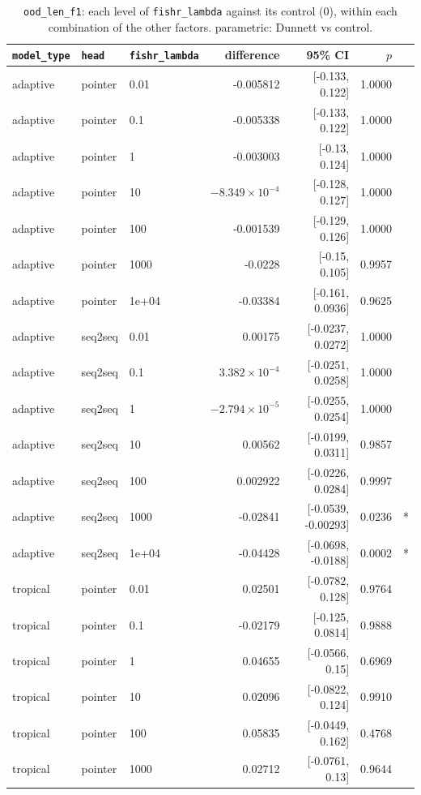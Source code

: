 \documentclass[10pt]{article}
\begin{document}
{\small
\begin{longtable}{lllrrrl}
\caption{\texttt{ood\_len\_f1}: each level of \texttt{fishr\_lambda} against its control (0), within each combination of the other factors. parametric: Dunnett vs control.}\label{tab:control-ood_len_f1}\\
\toprule
\texttt{model\_type} & \texttt{head} & \texttt{fishr\_lambda} & difference & 95\% CI & $p$ & \\
\midrule
\endhead
adaptive & pointer & 0.01 & -0.005812 & [-0.133, 0.122] & 1.0000 & \\
adaptive & pointer & 0.1 & -0.005338 & [-0.133, 0.122] & 1.0000 & \\
adaptive & pointer & 1 & -0.003003 & [-0.13, 0.124] & 1.0000 & \\
adaptive & pointer & 10 & $-8.349\times10^{-4}$ & [-0.128, 0.127] & 1.0000 & \\
adaptive & pointer & 100 & -0.001539 & [-0.129, 0.126] & 1.0000 & \\
adaptive & pointer & 1000 & -0.0228 & [-0.15, 0.105] & 0.9957 & \\
adaptive & pointer & 1e+04 & -0.03384 & [-0.161, 0.0936] & 0.9625 & \\
adaptive & seq2seq & 0.01 & 0.00175 & [-0.0237, 0.0272] & 1.0000 & \\
adaptive & seq2seq & 0.1 & $3.382\times10^{-4}$ & [-0.0251, 0.0258] & 1.0000 & \\
adaptive & seq2seq & 1 & $-2.794\times10^{-5}$ & [-0.0255, 0.0254] & 1.0000 & \\
adaptive & seq2seq & 10 & 0.00562 & [-0.0199, 0.0311] & 0.9857 & \\
adaptive & seq2seq & 100 & 0.002922 & [-0.0226, 0.0284] & 0.9997 & \\
adaptive & seq2seq & 1000 & -0.02841 & [-0.0539, -0.00293] & 0.0236 & *\\
adaptive & seq2seq & 1e+04 & -0.04428 & [-0.0698, -0.0188] & 0.0002 & *\\
tropical & pointer & 0.01 & 0.02501 & [-0.0782, 0.128] & 0.9764 & \\
tropical & pointer & 0.1 & -0.02179 & [-0.125, 0.0814] & 0.9888 & \\
tropical & pointer & 1 & 0.04655 & [-0.0566, 0.15] & 0.6969 & \\
tropical & pointer & 10 & 0.02096 & [-0.0822, 0.124] & 0.9910 & \\
tropical & pointer & 100 & 0.05835 & [-0.0449, 0.162] & 0.4768 & \\
tropical & pointer & 1000 & 0.02712 & [-0.0761, 0.13] & 0.9644 & \\

\end{longtable}}
\end{document}

